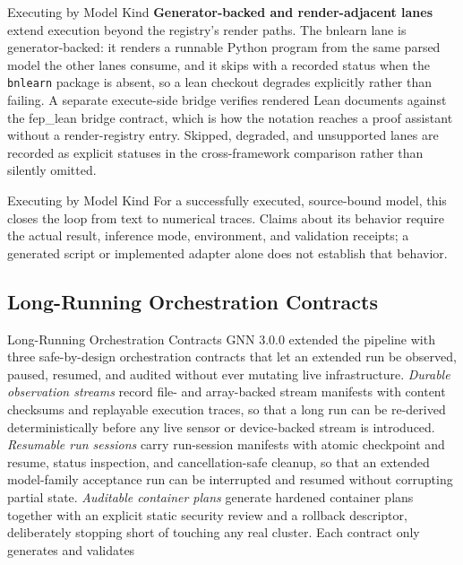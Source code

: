 \documentclass[
  ignorenonframetext,
]{beamer}
\begin{document}
\begin{frame}{Executing by Model Kind}
\textbf{Generator-backed and render-adjacent lanes} extend execution
beyond the registry's render paths. The bnlearn lane is
generator-backed: it renders a runnable Python program from the same
parsed model the other lanes consume, and it skips with a recorded
status when the \texttt{bnlearn} package is absent, so a lean checkout
degrades explicitly rather than failing. A separate execute-side bridge
verifies rendered Lean documents against the fep\_lean bridge contract,
which is how the notation reaches a proof assistant without a
render-registry entry. Skipped, degraded, and unsupported lanes are
recorded as explicit statuses in the cross-framework comparison rather
than silently omitted.

\end{frame}

\begin{frame}{Executing by Model Kind}
For a successfully executed, source-bound model, this closes the loop
from text to numerical traces. Claims about its behavior require the
actual result, inference mode, environment, and validation receipts; a
generated script or implemented adapter alone does not establish that
behavior.
\end{frame}

\subsection{Long-Running Orchestration
Contracts}\label{long-running-orchestration-contracts}

\begin{frame}{Long-Running Orchestration
Contracts}
GNN 3.0.0 extended the pipeline with three safe-by-design orchestration
contracts that let an extended run be observed, paused, resumed, and
audited without ever mutating live infrastructure. \emph{Durable
observation streams} record file- and array-backed stream manifests with
content checksums and replayable execution traces, so that a long run
can be re-derived deterministically before any live sensor or
device-backed stream is introduced. \emph{Resumable run sessions} carry
run-session manifests with atomic checkpoint and resume, status
inspection, and cancellation-safe cleanup, so that an extended
model-family acceptance run can be interrupted and resumed without
corrupting partial state. \emph{Auditable container plans} generate
hardened container plans together with an explicit static security
review and a rollback descriptor, deliberately stopping short of
touching any real cluster. Each contract only generates and validates
\end{frame}
\end{document}
